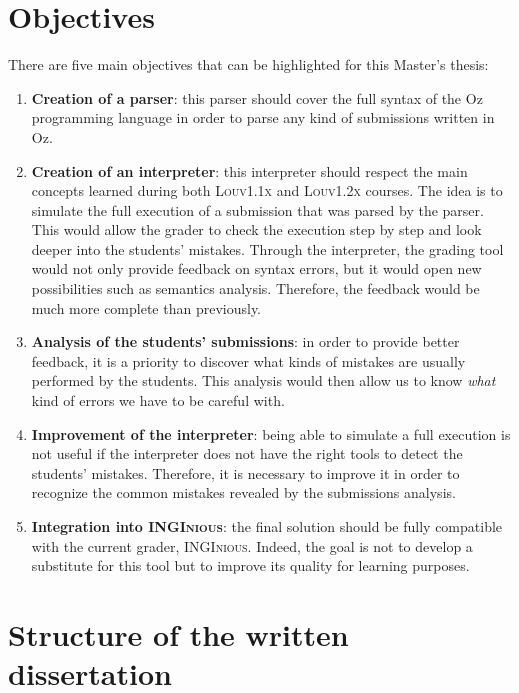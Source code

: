 \documentclass[11pt,a4paper,twoside,openright]{report}
\begin{document}
\section{Objectives}

There are five main objectives that can be highlighted for this Master's thesis:

\begin{enumerate}
\item \textbf{Creation of a parser}: this parser should cover the 
full syntax of the Oz programming language in order to parse any kind of 
submissions written in Oz.
\item \textbf{Creation of an interpreter}: this interpreter should respect 
the main concepts learned during both \textsc{Louv1.1x} and \textsc{Louv1.2x} 
courses. The idea is to simulate the full execution of a submission that was 
parsed by the parser. This would allow the grader to check the execution step by 
step and look deeper into the students' mistakes. Through the interpreter, the 
grading tool would not only provide feedback on syntax errors, but it would open 
new possibilities such as semantics analysis. Therefore, the feedback would be 
much more complete than previously.
\item \textbf{Analysis of the students' submissions}: in order to provide
better feedback, it is a priority to discover what kinds of mistakes are 
usually performed by the students. This analysis would then allow us to know 
\textit{what} kind of errors we have to be careful with.
\item \textbf{Improvement of the interpreter}: being able to simulate a full 
execution is not useful if the interpreter does not have the right tools to detect 
the students' mistakes. Therefore, it is necessary to improve it in order to 
recognize the common mistakes revealed by the submissions analysis.
\item \textbf{Integration into \textsc{INGInious}}: the final solution should 
be fully compatible with the current grader, \textsc{INGInious}. Indeed, the 
goal is not to develop a substitute for this tool but to improve its quality 
for learning purposes.
\end{enumerate}

\section{Structure of the written dissertation}
\end{document}
